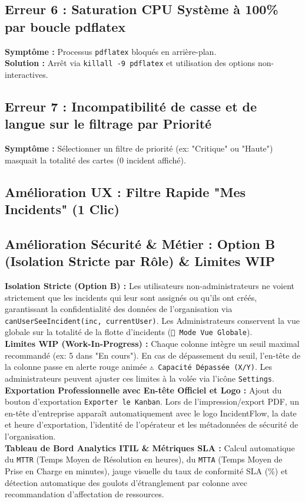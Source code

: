 \documentclass[11pt,a4paper]{article}
\begin{document}
\subsection*{Erreur 6 : Saturation CPU Système à 100\% par boucle pdflatex}
\textbf{Symptôme :} Processus \texttt{pdflatex} bloqués en arrière-plan.\\
\textbf{Solution :} Arrêt via \texttt{killall -9 pdflatex} et utilisation des options non-interactives.

\subsection*{Erreur 7 : Incompatibilité de casse et de langue sur le filtrage par Priorité}
\textbf{Symptôme :} Sélectionner un filtre de priorité (ex: "Critique" ou "Haute") masquait la totalité des cartes (0 incident affiché).\\
\subsection*{Amélioration UX : Filtre Rapide "Mes Incidents" (1 Clic)}
\subsection*{Amélioration Sécurité \& Métier : Option B (Isolation Stricte par Rôle) \& Limites WIP}
\textbf{Isolation Stricte (Option B) :} Les utilisateurs non-administrateurs ne voient strictement que les incidents qui leur sont assignés ou qu'ils ont créés, garantissant la confidentialité des données de l'organisation via \texttt{canUserSeeIncident(inc, currentUser)}. Les Administrateurs conservent la vue globale sur la totalité de la flotte d'incidents (\texttt{👑 Mode Vue Globale}).\\
\textbf{Limites WIP (Work-In-Progress) :} Chaque colonne intègre un seuil maximal recommandé (ex: 5 dans "En cours"). En cas de dépassement du seuil, l'en-tête de la colonne passe en alerte rouge animée \texttt{⚠️ Capacité Dépassée (X/Y)}. Les administrateurs peuvent ajuster ces limites à la volée via l'icône \texttt{Settings}.\\
\textbf{Exportation Professionnelle avec En-tête Officiel et Logo :} Ajout du bouton d'exportation \texttt{Exporter le Kanban}. Lors de l'impression/export PDF, un en-tête d'entreprise apparaît automatiquement avec le logo IncidentFlow, la date et heure d'exportation, l'identité de l'opérateur et les métadonnées de sécurité de l'organisation.\\
\textbf{Tableau de Bord Analytics ITIL \& Métriques SLA :} Calcul automatique du \texttt{MTTR} (Temps Moyen de Résolution en heures), du \texttt{MTTA} (Temps Moyen de Prise en Charge en minutes), jauge visuelle du taux de conformité SLA (\%) et détection automatique des goulots d'étranglement par colonne avec recommandation d'affectation de ressources.
\end{document}
